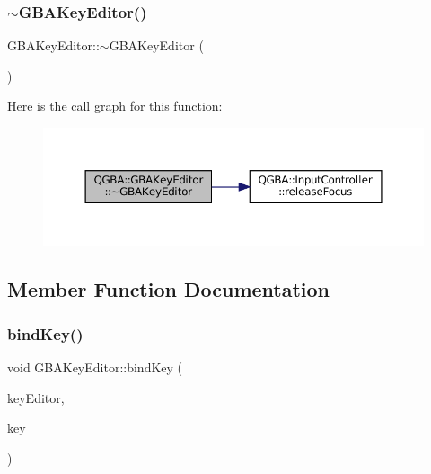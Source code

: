 \subsubsection{\texorpdfstring{$\sim$\+G\+B\+A\+Key\+Editor()}{~GBAKeyEditor()}}
{\footnotesize\ttfamily G\+B\+A\+Key\+Editor\+::$\sim$\+G\+B\+A\+Key\+Editor (\begin{DoxyParamCaption}{ }\end{DoxyParamCaption})\hspace{0.3cm}{\ttfamily [virtual]}}

Here is the call graph for this function\+:
\nopagebreak
\begin{figure}[H]
\begin{center}
\leavevmode
\includegraphics[width=350pt]{class_q_g_b_a_1_1_g_b_a_key_editor_aa382ba1e6de362617296a3803cea41e7_cgraph}
\end{center}
\end{figure}


\subsection{Member Function Documentation}
\mbox{\label{class_q_g_b_a_1_1_g_b_a_key_editor_a7cba79624d45ce9284f6675447504e9a}} 
\subsubsection{\texorpdfstring{bind\+Key()}{bindKey()}}
{\footnotesize\ttfamily void G\+B\+A\+Key\+Editor\+::bind\+Key (\begin{DoxyParamCaption}\item[{const \mbox{\hyperlink{class_q_g_b_a_1_1_key_editor}{Key\+Editor}} $\ast$}]{key\+Editor,  }\item[{G\+B\+A\+Key}]{key }\end{DoxyParamCaption})\hspace{0.3cm}{\ttfamily [private]}}

